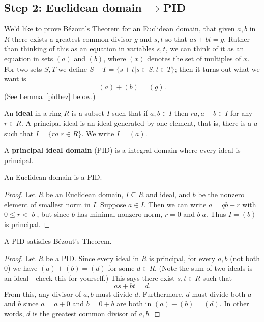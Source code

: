 \subsection{Step 2: Euclidean domain$\implies$PID}
We'd like to prove B\'ezout's Theorem for an Euclidean domain, that given $a,b$ in $R$ there exists a greatest common divisor $g$ and $s,t$ so that $as+bt=g$. Rather than thinking of this as an equation in variables $s,t$, we can think of it as an equation in sets $(a)$ and $(b)$, where $(x)$ denotes the set of multiples of $x$. For two sets $S,T$ we define $S+T=\{s+t|s\in S,t\in T\}$; then it turns out what we want is
\[
(a)+(b)=(g).
\]
(See Lemma~\ref{pidbez} below.)

\begin{df}
An \textbf{ideal} in a ring $R$ is a subset $I$ such that if $a,b\in I$ then $ra,a+b\in I$ for any $r\in R$. A principal ideal is an ideal generated by one element, that is, there is a $a$ such that $I=\{ra|r\in R\}$. We write $I=(a)$.

A \textbf{principal ideal domain} (PID) is a integral domain where every ideal is principal.
\end{df}

\begin{thm}
An Euclidean domain is a PID.
\end{thm}
\begin{proof}
Let $R$ be an Euclidean domain, $I\subseteq R$ and ideal, and $b$ be the nonzero element of smallest norm in $I$.
Suppose $ a\in I$. Then we can write $ a = qb + r$ with $ 0\leq r < |b|$, but since $ b$ has minimal nonzero norm, $ r = 0$ and $ b|a$. Thus $ I=(b)$ is principal.
\end{proof}

\begin{lem}\label{pidbez}
A PID satisfies B\'ezout's Theorem.
\end{lem}
\begin{proof}
Let $R$ be a PID. Since every ideal in $R$ is principal, for every $a,b$ (not both 0) we have $(a)+(b)=(d)$
for some $d\in R$. (Note the sum of two ideals is an ideal---check this for yourself.) This says there exist $ s,t\in R$ such that
\[as + bt = d.\]
From this, any divisor of $a,b$ must divide $ d$. Furthermore, $d$ must divide both $a$ and $b$ since $a=a+0$ and $b=0+b$ are both in $(a)+(b)= (d)$. In other words, $d$ is the greatest common divisor of $ a,b$.
\end{proof}
